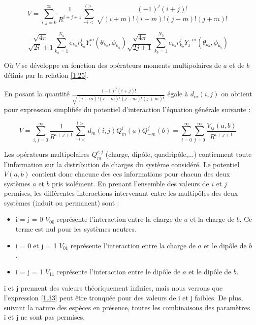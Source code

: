 	\begin{equation}
	V = \sum_{i,j=0}^{\infty} \frac{1}{R^{i+j+1}} \sum_{-l<}^{l>} \frac{(-1)^{j} (i+j)!} {\sqrt{(i+m)! (i-m)! (j-m)! (j+m)!}}
	\end{equation}
	
	\begin{equation}
	\frac{\sqrt{4\pi}}{\sqrt{2i}+ 1} \sum_{k_{a}=1}^{N_{a}} e_{k_{a}} r_{k_{a}}^{i} Y_{i}^{m} (\theta_{k_{a}},\phi_{k_{a}}) \frac{\sqrt{4\pi}}{\sqrt{2j+ 1}} \sum_{k_{b}=1}^{N_{b}} e_{k_{b}}r_{k_{b}}^{j} Y_{j}^{-m}(\theta_{k_{b}},\phi_{k_{b}})
	\end{equation}
	
	Où $V$ se développe en fonction des opérateurs moments multipolaires de $a$ et de $b$ définis par la relation \ref{1.25}.
	
	En posant la quantité $\frac{(-1)^{j} (i+j)!} {\sqrt{(i+m)! (i-m)! (j-m)! (j+m)!}}$ égale à $d_{m}(i,j)$ on obtient pour expression simplifiée du potentiel d'interaction l'équation générale suivante : 
	
	\begin{equation}
	V = \sum_{i,j=0}^{\infty} \frac{1}{R^{i+j+1}} \sum_{-l<}^{l>} d_{m}(i,j) Q_{m}^{i}(a) Q_{-m}^{j} (b) = \sum_{i=0}^{\infty} \sum_{j=0}^{\infty} \frac{V_{ij}(a,b)}{R^{i+j+1}} \label{1.33}
	\end{equation}
	
	Les opérateurs multipolaires $Q_{m}^{i;j}$ (charge, dipôle, quadripôle,...) contiennent toute l'information sur la distribution de charges du système considéré. Le potentiel $V(a,b)$ contient donc chacune des ces informations pour chacun des deux systèmes $a$ et $b$ pris isolément. En prenant l'ensemble des valeurs de $i$ et $j$ permises, les différentes interactions intervenant entre les multipôles des deux systèmes (induit ou permanent) sont :
	
	\begin{itemize}
		\item i = j = 0 $V_{00}$ représente l'interaction entre la charge de $a$ et la charge de $b$. Ce terme est nul pour les systèmes neutres. 	
		\item i = 0 et j = 1 $V_{01}$ représente l'interaction entre la charge de $a$ et le dipôle de $b$. 	
		\item i = j = 1  $V_{11}$ représente l'interaction entre le dipôle de $a$ et le dipôle de $b$.
	\end{itemize}
	
	i et j prennent des valeurs théoriquement infinies, mais nous verrons que l'expression \ref{1.33} peut être tronquée pour des valeurs de i et j faibles. De plus, suivant la nature des espèces en présence, toutes les combinaisons des paramètres i et j ne sont pas permises.
	
